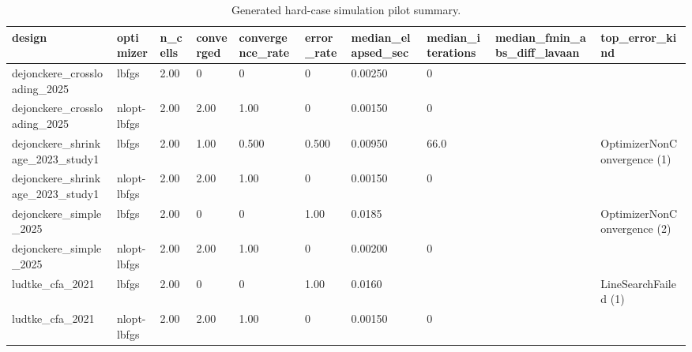\begin{table}[ht]
\centering
\caption{Generated hard-case simulation pilot summary.}
\begin{tabular}{llllllllll}
\hline
design & optimizer & n\_cells & converged & convergence\_rate & error\_rate & median\_elapsed\_sec & median\_iterations & median\_fmin\_abs\_diff\_lavaan & top\_error\_kind
\\ \hline
dejonckere\_crossloading\_2025 & lbfgs & 2.00 & 0 & 0 & 0 & 0.00250 & 0 &  &  \\
dejonckere\_crossloading\_2025 & nlopt-lbfgs & 2.00 & 2.00 & 1.00 & 0 & 0.00150 & 0 &  &  \\
dejonckere\_shrinkage\_2023\_study1 & lbfgs & 2.00 & 1.00 & 0.500 & 0.500 & 0.00950 & 66.0 &  & OptimizerNonConvergence (1) \\
dejonckere\_shrinkage\_2023\_study1 & nlopt-lbfgs & 2.00 & 2.00 & 1.00 & 0 & 0.00150 & 0 &  &  \\
dejonckere\_simple\_2025 & lbfgs & 2.00 & 0 & 0 & 1.00 & 0.0185 &  &  & OptimizerNonConvergence (2) \\
dejonckere\_simple\_2025 & nlopt-lbfgs & 2.00 & 2.00 & 1.00 & 0 & 0.00200 & 0 &  &  \\
ludtke\_cfa\_2021 & lbfgs & 2.00 & 0 & 0 & 1.00 & 0.0160 &  &  & LineSearchFailed (1) \\
ludtke\_cfa\_2021 & nlopt-lbfgs & 2.00 & 2.00 & 1.00 & 0 & 0.00150 & 0 &  &  \\
\hline
\end{tabular}
\end{table}
